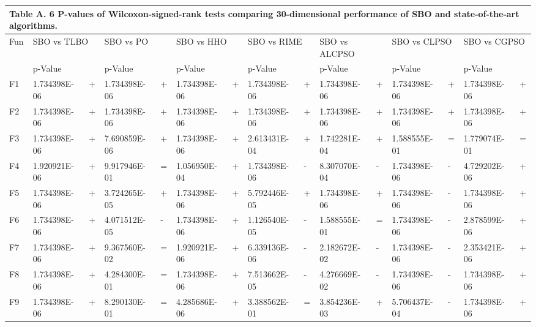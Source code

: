 \documentclass{article} %
\begin{document}
\begin{tabular}{|p{0.3in}|p{0.5in}|p{0.2in}|p{0.5in}|p{0.2in}|p{0.6in}|p{0.1in}|p{0.6in}|p{0.1in}|p{0.5in}|p{0.1in}|p{0.5in}|p{0.1in}|p{0.5in}|p{0.2in}|} \hline 
\multicolumn{15}{|p{1in}|}{\textbf{Table A. }6\textbf{ }P-values of Wilcoxon-signed-rank tests comparing 30-dimensional performance of SBO and state-of-the-art algorithms.\textbf{}} \\ \hline 
Fun & \multicolumn{2}{|p{0.7in}|}{SBO vs TLBO} & \multicolumn{2}{|p{0.7in}|}{SBO vs PO} & \multicolumn{2}{|p{0.7in}|}{SBO vs HHO} & \multicolumn{2}{|p{0.7in}|}{SBO vs RIME} & \multicolumn{2}{|p{0.7in}|}{SBO vs ALCPSO} & \multicolumn{2}{|p{0.7in}|}{SBO vs CLPSO} & \multicolumn{2}{|p{0.7in}|}{SBO vs CGPSO} \\ \hline 
 & p-Value &  & p-Value &  & p-Value &  & p-Value &  & p-Value &  & p-Value &  & p-Value &  \\ \hline 
F1 & 1.734398E-06 & + & 1.734398E-06 & + & 1.734398E-06 & + & 1.734398E-06 & + & 1.734398E-06 & + & 1.734398E-06 & + & 1.734398E-06 & + \\ \hline 
F2 & 1.734398E-06 & + & 1.734398E-06 & + & 1.734398E-06 & + & 1.734398E-06 & + & 1.734398E-06 & + & 1.734398E-06 & + & 1.734398E-06 & + \\ \hline 
F3 & 1.734398E-06 & + & 7.690859E-06 & + & 1.734398E-06 & + & 2.613431E-04 & + & 1.742281E-04 & + & 1.588555E-01 & = & 1.779074E-01 & = \\ \hline 
F4 & 1.920921E-06 & + & 9.917946E-01 & = & 1.056950E-04 & + & 1.734398E-06 & - & 8.307070E-04 & - & 1.734398E-06 & - & 4.729202E-06 & + \\ \hline 
F5 & 1.734398E-06 & + & 3.724265E-05 & + & 1.734398E-06 & + & 5.792446E-05 & + & 1.734398E-06 & + & 1.734398E-06 & - & 1.734398E-06 & + \\ \hline 
F6 & 1.734398E-06 & + & 4.071512E-05 & - & 1.734398E-06 & + & 1.126540E-05 & - & 1.588555E-01 & = & 1.734398E-06 & - & 2.878599E-06 & + \\ \hline 
F7 & 1.734398E-06 & + & 9.367560E-02 & = & 1.920921E-06 & + & 6.339136E-06 & - & 2.182672E-02 & - & 1.734398E-06 & - & 2.353421E-06 & + \\ \hline 
F8 & 1.734398E-06 & + & 4.284300E-01 & = & 1.734398E-06 & + & 7.513662E-05 & - & 4.276669E-02 & - & 1.734398E-06 & - & 1.734398E-06 & + \\ \hline 
F9 & 1.734398E-06 & + & 8.290130E-01 & = & 4.285686E-06 & + & 3.388562E-01 & = & 3.854236E-03 & + & 5.706437E-04 & - & 1.734398E-06 & + \\ \hline 

\end{tabular}
\end{document}
